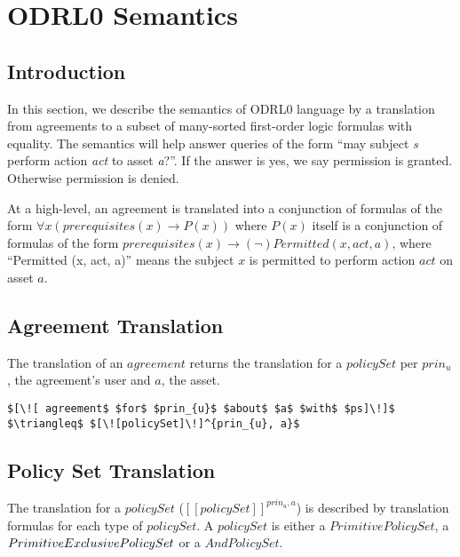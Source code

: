 \chapter{ODRL0 Semantics}

                  
\section{Introduction}


In this section, we describe the semantics of ODRL0 language by a translation from agreements to a subset of many-sorted first-order logic formulas with equality. The semantics will help answer queries of the form ``may subject \emph{s} perform action \emph{act} to asset \emph{a}?''. If the answer is yes, we say permission is granted. Otherwise permission is denied. 


At a high-level, an agreement is translated into a conjunction of formulas of the form $\forall x ( prerequisites(x) \rightarrow P(x))$ where $P(x)$ itself is a conjunction of formulas of the form $ prerequisites(x) \rightarrow (\lnot) Permitted (x, act, a)$, where ``Permitted (x, act, a)'' means the subject $x$ is permitted to perform action $act$ on asset $a$.

\section{Agreement Translation}
The translation of an $agreement$ returns the translation for a $policySet$ per $prin_{u}$, the agreement's user and $a$, the asset.


\lstset{mathescape, language=AST}  
\begin{lstlisting}[frame=single, caption={Agreement Translation},label={lst:transAgreementast}]
$[\![ agreement$ $for$ $prin_{u}$ $about$ $a$ $with$ $ps]\!]$ $\triangleq$ $[\![policySet]\!]^{prin_{u}, a}$
\end{lstlisting}

\section{Policy Set Translation}
The translation for a $policySet$ ($[\![policySet]\!]^{prin_{u}, a}$) is described by translation formulas for each type of $policySet$. A $policySet$ is either a $PrimitivePolicySet$, a $\linebreak PrimitiveExclusivePolicySet$ or a $AndPolicySet$.

